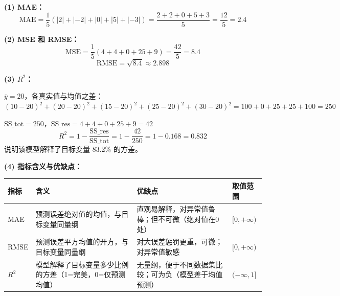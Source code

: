 \documentclass[a4paper,11pt]{ctexart}
\begin{document}
\begin{solutionbox}[参考答案与详细解析]
    \textbf{(1) MAE：}
    \[
    \text{MAE} = \frac{1}{5}(|2|+|-2|+|0|+|5|+|-3|) = \frac{2+2+0+5+3}{5} = \frac{12}{5} = \mathbf{2.4}
    \]

    \textbf{(2) MSE 和 RMSE：}
    \[
    \text{MSE} = \frac{1}{5}(4+4+0+25+9) = \frac{42}{5} = \mathbf{8.4}
    \]
    \[
    \text{RMSE} = \sqrt{8.4} \approx \mathbf{2.898}
    \]

    \textbf{(3) $R^2$：}

    $\bar{y}=20$，各真实值与均值之差：$(10-20)^2+(20-20)^2+(15-20)^2+(25-20)^2+(30-20)^2 = 100+0+25+25+100=250$

    $\text{SS\_tot} = 250$，$\text{SS\_res} = 4+4+0+25+9 = 42$
    \[
    R^2 = 1 - \frac{\text{SS\_res}}{\text{SS\_tot}} = 1 - \frac{42}{250} = 1 - 0.168 = \mathbf{0.832}
    \]
    说明该模型解释了目标变量 83.2\% 的方差。

    \textbf{(4) 指标含义与优缺点：}
    \begin{center}
    \begin{tabular}{p{2cm} p{4cm} p{4.5cm} p{2cm}}
        \toprule
        指标 & 含义 & 优缺点 & 取值范围 \\
        \midrule
        MAE & 预测误差绝对值的均值，与目标变量同量纲 & 直观易解释，对异常值鲁棒；但不可微（绝对值在0处） & $[0,+\infty)$ \\[0.8em]
        RMSE & 预测误差平方均值的开方，与目标变量同量纲 & 对大误差惩罚更重，可微；对异常值敏感 & $[0,+\infty)$ \\[0.8em]
        $R^2$ & 模型解释了目标变量多少比例的方差（1=完美，0=仅预测均值） & 无量纲，便于不同数据集比较；可为负（模型差于均值预测） & $(-\infty,1]$ \\
        \bottomrule
    \end{tabular}
    \end{center}
\end{solutionbox}
\end{document}
